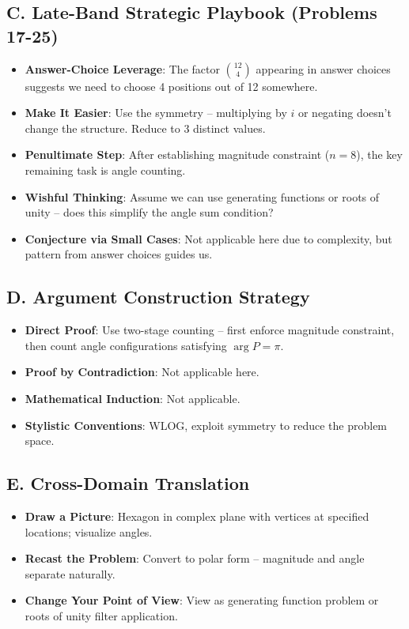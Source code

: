 \documentclass[]{article}
\begin{document}
\begin{strategicbox}
\subsection*{C. Late-Band Strategic Playbook (Problems 17-25)}
\begin{itemize}[leftmargin=*]
    \item \textbf{Answer-Choice Leverage}: The factor $\binom{12}{4}$ appearing in answer choices suggests we need to choose 4 positions out of 12 somewhere.
    \item \textbf{Make It Easier}: Use the symmetry -- multiplying by $i$ or negating doesn't change the structure. Reduce to 3 distinct values.
    \item \textbf{Penultimate Step}: After establishing magnitude constraint ($n=8$), the key remaining task is angle counting.
    \item \textbf{Wishful Thinking}: Assume we can use generating functions or roots of unity -- does this simplify the angle sum condition?
    \item \textbf{Conjecture via Small Cases}: Not applicable here due to complexity, but pattern from answer choices guides us.
\end{itemize}

\subsection*{D. Argument Construction Strategy}
\begin{itemize}[leftmargin=*]
    \item \textbf{Direct Proof}: Use two-stage counting -- first enforce magnitude constraint, then count angle configurations satisfying $\arg P = \pi$.
    \item \textbf{Proof by Contradiction}: Not applicable here.
    \item \textbf{Mathematical Induction}: Not applicable.
    \item \textbf{Stylistic Conventions}: WLOG, exploit symmetry to reduce the problem space.
\end{itemize}

\subsection*{E. Cross-Domain Translation}
\begin{itemize}[leftmargin=*]
    \item \textbf{Draw a Picture}: Hexagon in complex plane with vertices at specified locations; visualize angles.
    \item \textbf{Recast the Problem}: Convert to polar form -- magnitude and angle separate naturally.
    \item \textbf{Change Your Point of View}: View as generating function problem or roots of unity filter application.
\end{itemize}
\end{strategicbox}
\end{document}
